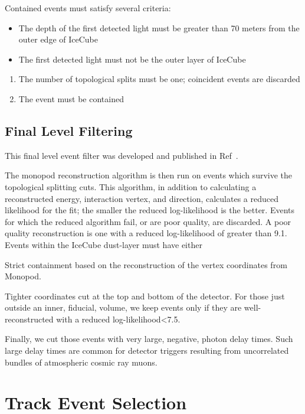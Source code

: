 \documentclass[main.tex]{subfiles}
\begin{document}
Contained events must satisfy several criteria:
\begin{itemize}
    \item The depth of the first detected light must be greater than 70 meters from the outer edge of IceCube
    \item The first detected light must not be the outer layer of IceCube
\end{itemize}

\begin{enumerate}
    \item The number of topological splits must be one; coincident events are discarded
    \item The event must be contained 
\end{enumerate}

\subsection{Final Level Filtering}

This final level event filter was developed and published in Ref~\cite{2018PhDT17N}.

The monopod reconstruction algorithm is then run on events which survive the topological splitting cuts. 
This algorithm, in addition to calculating a reconstructed energy, interaction vertex, and direction, calculates a  reduced likelihood for the fit; the smaller the reduced log-likelihood is the better. 
Events for which the reduced algorithm fail, or are poor quality, are discarded. 
A poor quality reconstruction is one with a reduced log-likelihood of greater than 9.1.
Events within the IceCube dust-layer must have either 

Strict containment based on the reconstruction of the vertex coordinates from Monopod. 

Tighter coordinates cut at the top and bottom of the detector. For those just outside an inner, fiducial, volume, we keep events only if they are well-reconstructed with a reduced log-likelihood<7.5. 

Finally, we cut those events with very large, negative, photon delay times. Such large delay times are common for detector triggers resulting from uncorrelated bundles of atmospheric cosmic ray muons. 

\section{Track Event Selection}
\end{document}
